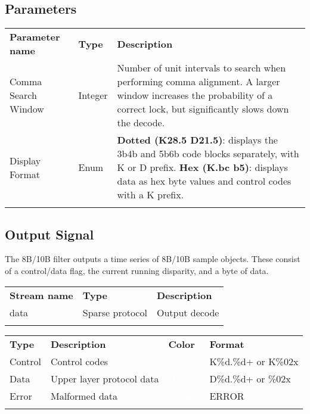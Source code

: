 \subsection{Parameters}

\begin{tabularx}{16cm}{llX}
\thickhline
\textbf{Parameter name} & \textbf{Type} & \textbf{Description} \\
\thinhline
Comma Search Window & Integer &
Number of unit intervals to search when performing comma alignment. A larger window increases the probability of a
correct lock, but significantly slows down the decode. \\
\thinhline
Display Format & Enum &
	\textbf{Dotted (K28.5 D21.5)}: displays the 3b4b and 5b6b code blocks separately, with K or D prefix. \newline
	\textbf{Hex (K.bc b5)}: displays data as hex byte values and control codes with a K prefix. \\
\thickhline
\end{tabularx}

\subsection{Output Signal}

The 8B/10B filter outputs a time series of 8B/10B sample objects. These consist of a control/data flag, the current
running disparity, and a byte of data.

\begin{tabularx}{16cm}{llX}
\thickhline
\textbf{Stream name} & \textbf{Type} & \textbf{Description} \\
\thickhline
data & Sparse protocol & Output decode \\
\thickhline
\end{tabularx}

\begin{tabularx}{16cm}{lllX}
\thickhline
\textbf{Type} & \textbf{Description} & \textbf{Color} & \textbf{Format} \\
\thickhline
Control & Control codes & \cellcolor{control}\textcolor{white}{Control} & K\%d.\%d+ or K\%02x\\
\thinhline
Data & Upper layer protocol data & \cellcolor{data}\textcolor{white}{Data} & D\%d.\%d+ or \%02x\\
\thinhline
Error & Malformed data & \cellcolor{error}\textcolor{white}{Error} & ERROR \\
\thickhline
\end{tabularx}

